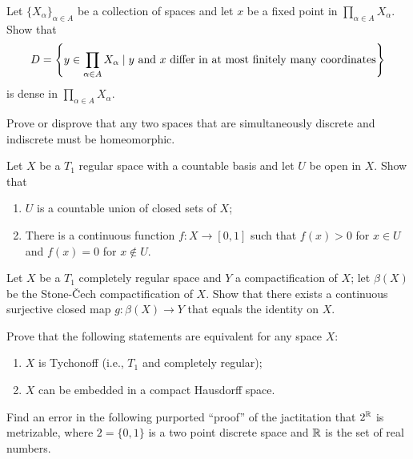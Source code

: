 \documentclass[12pt]{article}
\begin{document}
\vspace{10pt}
Let $\{ X_{\alpha}\}_{\alpha\in A}$ be a collection of spaces and let
$x$ be a fixed point in $\prod_{\alpha\in A} X_{\alpha}$. Show that
$$ D =\left\{ y\in \prod_{\alpha\in A} X_{\alpha} \mid
             y\ {\rm and}\ x\ {\rm differ\ in\ at\ most\ finitely\
             many\ coordinates} \right\} $$
is dense in $\prod_{\alpha\in A} X_{\alpha}$.

\vspace{10pt}
 Prove or disprove that any two spaces that are
simultaneously discrete and indiscrete must be homeomorphic.

\vspace{10pt}
Let $X$ be a $T_1$ regular space with a countable basis and
let $U$ be open in $X$. Show that
\begin{enumerate}
  \item $U$ is a countable union of closed sets of $X$;
  \item There is a continuous function $f: X\rightarrow [0, 1]$ such that
        $f(x)>0$ for $x\in U$ and $f(x)=0$ for $x\not\in U$.
\end{enumerate}

\vspace{10pt}
Let $X$ be a $T_1$ completely regular space and $Y$ a
compactification of $X$; let $\beta(X)$ be the Stone-\v{C}ech
compactification of $X$. Show that there exists a continuous surjective closed
map $g: \beta(X)\rightarrow Y$ that equals the identity on $X$.

\vspace{10pt}
Prove that the following statements are equivalent for any space $X$:
\begin{enumerate}
  \item $X$ is Tychonoff (i.e., $T_1$ and completely regular);
  \item $X$ can be embedded in a compact Hausdorff space.
\end{enumerate}

\vspace{10pt}
Find an error in the following purported ``proof''
of the jactitation that $2^{\Bbb R}$
is metrizable, where $2=\{0, 1\}$ is a two point discrete space and
${\Bbb R}$ is the set of real numbers.
\end{document}
